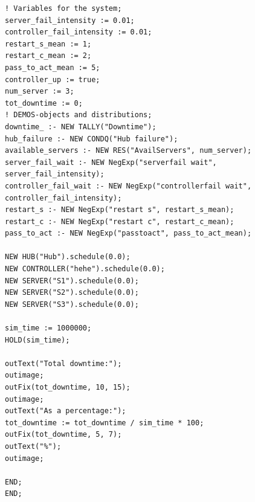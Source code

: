 \documentclass[11pt]{article}
\begin{document}
\begin{lstlisting}
! Variables for the system;
server_fail_intensity := 0.01;
controller_fail_intensity := 0.01;
restart_s_mean := 1;
restart_c_mean := 2;
pass_to_act_mean := 5;
controller_up := true;
num_server := 3;
tot_downtime := 0;
! DEMOS-objects and distributions;
downtime_ :- NEW TALLY("Downtime");
hub_failure :- NEW CONDQ("Hub failure");
available_servers :- NEW RES("AvailServers", num_server);
server_fail_wait :- NEW NegExp("serverfail wait", server_fail_intensity);
controller_fail_wait :- NEW NegExp("controllerfail wait", controller_fail_intensity);
restart_s :- NEW NegExp("restart s", restart_s_mean);
restart_c :- NEW NegExp("restart c", restart_c_mean);
pass_to_act :- NEW NegExp("passtoact", pass_to_act_mean);

NEW HUB("Hub").schedule(0.0);
NEW CONTROLLER("hehe").schedule(0.0);
NEW SERVER("S1").schedule(0.0);
NEW SERVER("S2").schedule(0.0);
NEW SERVER("S3").schedule(0.0);

sim_time := 1000000;
HOLD(sim_time);

outText("Total downtime:");
outimage;
outFix(tot_downtime, 10, 15);
outimage;
outText("As a percentage:");
tot_downtime := tot_downtime / sim_time * 100;
outFix(tot_downtime, 5, 7);
outText("%");
outimage;

END;
END;

\end{lstlisting}
\end{document}
